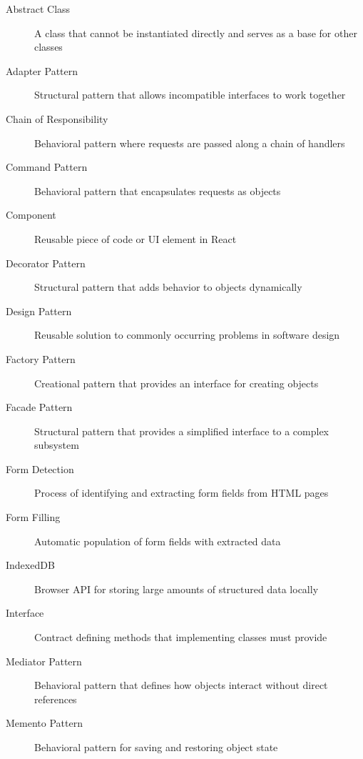 \documentclass[11pt, a4paper]{article}
\theoremstyle{plain}
\theoremstyle{definition}
\begin{document}
\begin{description}
    \item[Abstract Class] A class that cannot be instantiated directly and serves as a base for other classes
    
    \item[Adapter Pattern] Structural pattern that allows incompatible interfaces to work together
    
    \item[Chain of Responsibility] Behavioral pattern where requests are passed along a chain of handlers
    
    \item[Command Pattern] Behavioral pattern that encapsulates requests as objects
    
    \item[Component] Reusable piece of code or UI element in React
    
    \item[Decorator Pattern] Structural pattern that adds behavior to objects dynamically
    
    \item[Design Pattern] Reusable solution to commonly occurring problems in software design
    
    \item[Factory Pattern] Creational pattern that provides an interface for creating objects
    
    \item[Facade Pattern] Structural pattern that provides a simplified interface to a complex subsystem
    
    \item[Form Detection] Process of identifying and extracting form fields from HTML pages
    
    \item[Form Filling] Automatic population of form fields with extracted data
    
    \item[IndexedDB] Browser API for storing large amounts of structured data locally
    
    \item[Interface] Contract defining methods that implementing classes must provide
    
    \item[Mediator Pattern] Behavioral pattern that defines how objects interact without direct references
    
    \item[Memento Pattern] Behavioral pattern for saving and restoring object state
    

\end{description}
\end{document}
